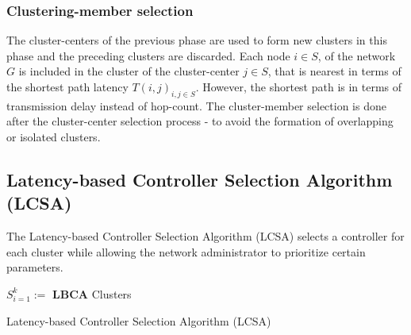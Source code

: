 \documentclass[a4paper,fleqn]{cas-dc}
\begin{document}
\subsubsection{Clustering-member selection}
\noindent The cluster-centers of the previous phase are used to form new clusters in this phase and the preceding clusters are discarded. Each node $i\in S$, of the network $G$ is included in the cluster of the cluster-center $j\in S$, that is nearest in terms of the shortest path latency $T(i,j)_{i,j \in S}$. However, the shortest path is in terms of transmission delay instead of hop-count. The cluster-member selection is done after the cluster-center selection process - to avoid the formation of overlapping or isolated clusters.


\subsection{Latency-based Controller Selection Algorithm (LCSA)} \label{lcsa}

\noindent The Latency-based Controller Selection Algorithm (LCSA) selects a controller for each cluster while allowing the network administrator to prioritize certain parameters.

\begin{algorithm}
	\SetAlgoLined
	$S_{i=1}^k :=$ \textbf{LBCA} Clusters\;
	\caption{Latency-based Controller Selection Algorithm (LCSA)} \label{algo:lcsa}
\end{algorithm}
\end{document}
